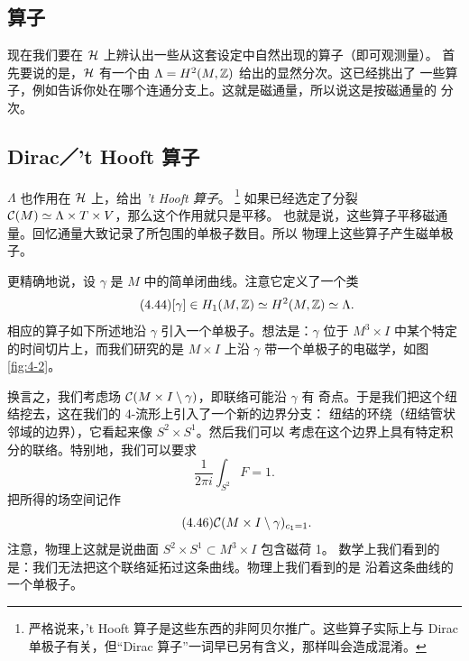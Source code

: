 
\subsection{算子}
\label{sec:4-5-1}

现在我们要在 $\mathcal{H}$ 上辨认出一些从这套设定中自然出现的算子（即可观测量）。
首先要说的是，$\mathcal{H}$ 有一个由 $\Lambda=H^{2}(M,\mathbb{Z})$ 给出的显然分次。这已经挑出了
一些算子，例如告诉你处在哪个连通分支上。这就是磁通量，所以说这是按磁通量的
分次。

\subsection*{Dirac／'t Hooft 算子}

$\Lambda$ 也作用在 $\mathcal{H}$ 上，给出 \emph{'t Hooft 算子}。
\footnote{严格说来，'t Hooft 算子是这些东西的非阿贝尔推广。这些算子实际上与
Dirac 单极子有关，但“Dirac 算子”一词早已另有含义，那样叫会造成混淆。}
如果已经选定了分裂 $\mathcal{C}(M)\simeq\Lambda\times T\times V$，那么这个作用就只是平移。
也就是说，这些算子平移磁通量。回忆通量大致记录了所包围的单极子数目。所以
物理上这些算子产生磁单极子。

更精确地说，设 $\gamma$ 是 $M$ 中的简单闭曲线。注意它定义了一个类
\begin{equation}\tag{4.44}
[\gamma]\in H_{1}(M,\mathbb{Z})\simeq H^{2}(M,\mathbb{Z})\simeq\Lambda.
\end{equation}
相应的算子如下所述地沿 $\gamma$ 引入一个单极子。想法是：$\gamma$ 位于
$M^{3}\times I$ 中某个特定的时间切片上，而我们研究的是 $M\times I$ 上沿
$\gamma$ 带一个单极子的电磁学，如图 \ref{fig:4-2}。

换言之，我们考虑场 $\mathcal{C}(M\times I\setminus\gamma)$，即联络可能沿 $\gamma$ 有
奇点。于是我们把这个纽结挖去，这在我们的 4-流形上引入了一个新的边界分支：
纽结的环绕（纽结管状邻域的边界），它看起来像 $S^{2}\times S^{1}$。然后我们可以
考虑在这个边界上具有特定积分的联络。特别地，我们可以要求
\begin{equation}\tag{4.45}
\frac{1}{2\pi i}\int_{S^{2}}F=1.
\end{equation}
把所得的场空间记作
\begin{equation}\tag{4.46}
\mathcal{C}(M\times I\setminus\gamma)_{c_{1}=1}.
\end{equation}
注意，物理上这就是说曲面 $S^{2}\times S^{1}\subset M^{3}\times I$ 包含磁荷 1。
数学上我们看到的是：我们无法把这个联络延拓过这条曲线。物理上我们看到的是
沿着这条曲线的一个单极子。


